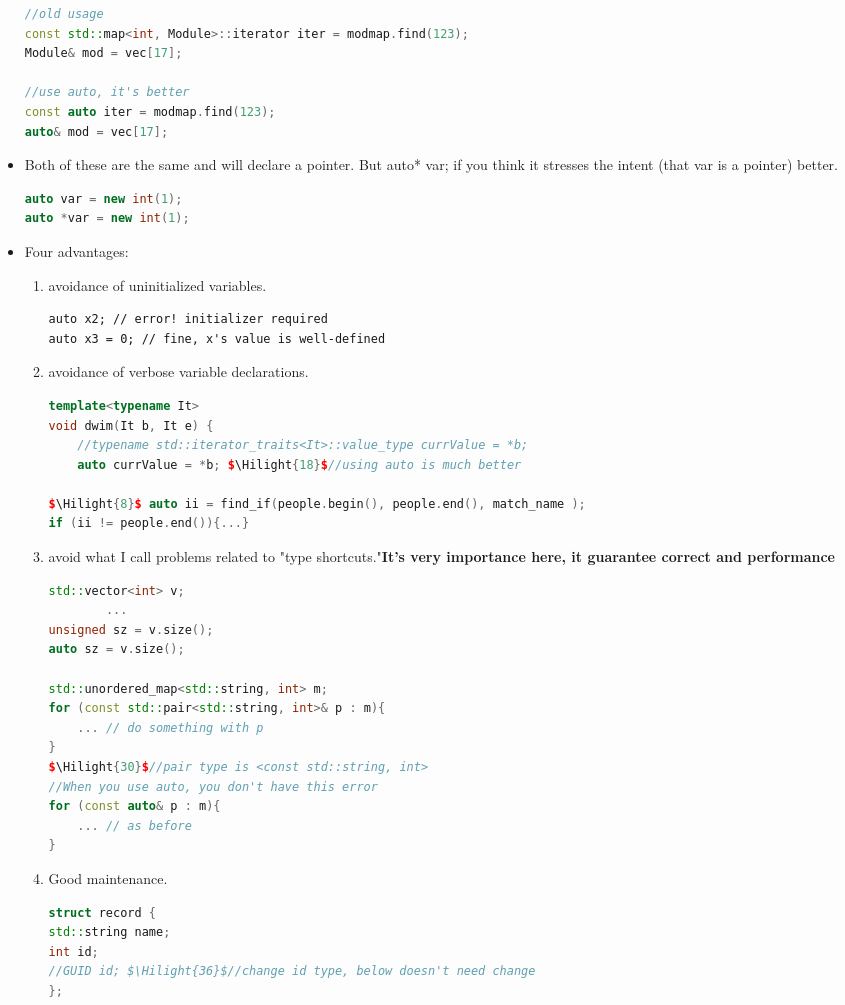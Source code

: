 \documentclass[a4paper,12pt,twoside]{book}
\newcommand{\Hilight}[1]{\makebox[0pt][l]{\color{yellow}\rule[-3pt]{#1em}{11pt}}}
\begin{document}
\begin{itemize}
\begin{lstlisting}[frame=single, language=c++]
//old usage
const std::map<int, Module>::iterator iter = modmap.find(123);
Module& mod = vec[17];

//use auto, it's better
const auto iter = modmap.find(123);
auto& mod = vec[17];
\end{lstlisting}
	
	\item Both of these are the same and will declare a pointer. But auto* var; if you think it stresses the intent (that var is a pointer) better.
\begin{lstlisting}[frame=single, language=c++]
auto var = new int(1);
auto *var = new int(1);
\end{lstlisting}


	\item Four advantages:
	\begin{enumerate}
		\item avoidance of uninitialized variables.
\begin{lstlisting}
auto x2; // error! initializer required
auto x3 = 0; // fine, x's value is well-defined
\end{lstlisting}
		\item avoidance of verbose variable declarations.
\begin{lstlisting}[frame=single, language=c++]
template<typename It>
void dwim(It b, It e) {
	//typename std::iterator_traits<It>::value_type currValue = *b;
	auto currValue = *b; $\Hilight{18}$//using auto is much better
	
$\Hilight{8}$ auto ii = find_if(people.begin(), people.end(), match_name );
if (ii != people.end()){...}
\end{lstlisting}

		\item avoid what I call problems related to "type shortcuts."\textbf{It's very importance here, it guarantee correct and performance}
\begin{lstlisting}[frame=single, language=c++]
std::vector<int> v;
		...
unsigned sz = v.size();
auto sz = v.size();
		
std::unordered_map<std::string, int> m;
for (const std::pair<std::string, int>& p : m){
	... // do something with p
}
$\Hilight{30}$//pair type is <const std::string, int>
//When you use auto, you don't have this error
for (const auto& p : m){
	... // as before
}
\end{lstlisting}
	\item Good maintenance.
\begin{lstlisting}[frame=single, language=c++, mathescape=true]
struct record {
std::string name;
int id;
//GUID id; $\Hilight{36}$//change id type, below doesn't need change
};


\end{lstlisting}
\end{enumerate}
\end{itemize}
\end{document}
